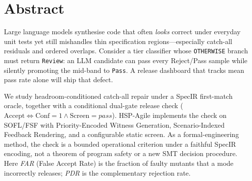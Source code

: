 \chapter*{Abstract}


Large language models synthesise code that often \emph{looks} correct under
everyday unit tests yet still mishandles thin specification regions---especially
catch-all residuals and ordered overlaps.
Consider a tier classifier whose \texttt{OTHERWISE} branch must return
\texttt{Review}: an LLM candidate can pass every Reject/Pass sample while
silently promoting the mid-band to \texttt{Pass}.
A release dashboard that tracks mean pass rate alone will ship that defect.

We study headroom-conditioned catch-all repair under a SpecIR first-match
oracle, together with a conditional dual-gate release check
($\mathrm{Accept}\Leftrightarrow\mathrm{Conf}{=}1\wedge\mathrm{Screen}{=}\mathit{pass}$).
HSP-Agile implements the check on SOFL/FSF with Priority-Encoded Witness
Generation, Scenario-Indexed Feedback Rendering, and a configurable static
screen.
As a formal-engineering method, the check is a bounded operational criterion
under a faithful SpecIR encoding, not a theorem of program safety or a new
SMT decision procedure.
Here \emph{FAR} (False Accept Rate) is the fraction of faulty mutants that a
mode incorrectly releases; \emph{PDR} is the complementary rejection rate.

